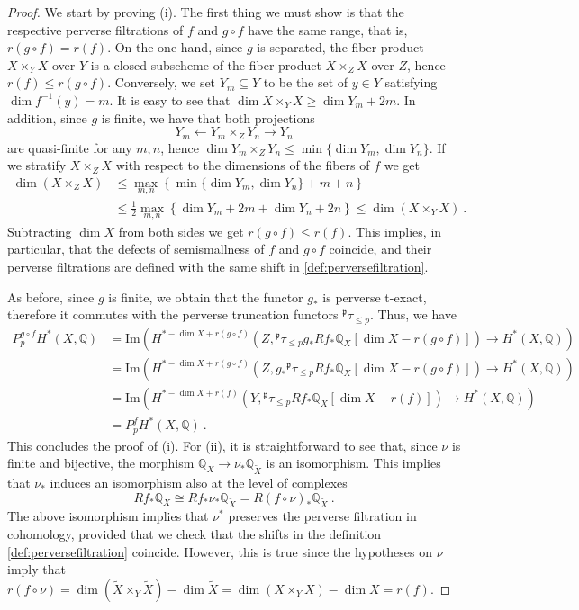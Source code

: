 \documentclass[11pt, a4paper]{amsart}
\theoremstyle{definition}
\theoremstyle{myitemstyle}
\newcommand{\Q}{\mathbb{Q}}
\begin{document}
\begin{proof}
We start by proving (i). The first thing we must show is that the respective perverse filtrations of $f$ and $g\circ f$ have the same range, that is, $r(g\circ f)=r(f)$. On the one hand, since $g$ is separated, the fiber product $X\times_YX$ over $Y$ is a closed subscheme of the fiber product $X\times_ZX$ over $Z$, hence $r(f)\leq r(g\circ f)$. Conversely, we set $Y_m\subseteq Y$ to be the set of $y\in Y$ satisfying $\dim f^{-1}(y)=m$. It is easy to see that $\dim X\times_Y X\geq \dim Y_m+2m$.
In addition, since $g$ is finite,  we have that both projections
\[ 
    Y_m\leftarrow Y_m\times_ZY_n\rightarrow Y_n
\]
are quasi-finite for any $m,n$, hence $\dim Y_m\times_ZY_n\leq \min\{\dim Y_m, \dim Y_n\}$.
If we stratify $X\times_ZX$ with respect to the dimensions of the fibers of $f$ we get
\begin{align*}
\dim(X\times_ZX) &\leq \max_{m,n}\left\lbrace\min\{\dim Y_m, \dim Y_n\}+m+n\right\rbrace\\
 &\leq \frac{1}{2}\max_{m,n}\left\lbrace \dim Y_m +2m +\dim Y_n+2n\right\rbrace\leq \dim (X\times_YX)\ .
\end{align*}
Subtracting $\dim X$ from both sides we get  $r(g\circ f)\leq r(f)$.
This implies, in particular, that the defects of semismallness of $f$ and $g\circ f$ coincide, and their perverse filtrations are defined with the same shift in \eqref{def:perversefiltration}.

As before, since $g$ is finite, we obtain that the functor $g_*$ is perverse t-exact, therefore it commutes with the perverse truncation functors $^{\mathfrak p}\tau_{\leq p}$. Thus, we have 
\begin{align*}
P^{g\circ f}_pH^*(X,\mathbb{Q})&=\mathrm{Im}\left( H^{*-\dim X+r(g\circ f)}\left( Z, {}^{\mathfrak{p}}\tau_{\leq p} g_*R f_* \mathbb{Q}_X[\dim X-r(g\circ f)] \right) \longrightarrow H^*(X, \mathbb{Q}) \right)\\
&=\mathrm{Im}\left( H^{*-\dim X+r(g\circ f)}\left( Z, g_* {}^{\mathfrak{p}}\tau_{\le p} R f_* \mathbb{Q}_X [\dim X-r(g\circ f)]\right) \longrightarrow H^*(X, \mathbb{Q}) \right)\\
&=\mathrm{Im}\left( H^{*-\dim X+r(f)}\left(Y, {}^{\mathfrak{p}}\tau_{\le p} R f_* \mathbb{Q}_X [\dim X-r(f)]\right) \longrightarrow H^*(X, \mathbb{Q}) \right)\\
&=P_p^fH^*(X,\mathbb{Q})\ .
\end{align*}
This concludes the proof of (i). 
For (ii), it is straightforward to see that, since $\nu$ is finite and bijective, the morphism $\mathbb{Q}_X\rightarrow \nu_*\Q_{\widetilde{X}}$ is an isomorphism. This implies that $\nu_*$ induces an isomorphism also at the level of complexes
\[
    Rf_*\mathbb{Q}_X\cong Rf_*\nu_*\mathbb{Q}_{\widetilde{X}}=R(f\circ \nu)_*\mathbb{Q}_{\widetilde{X}}\ .
\]
The above isomorphism implies that $\nu^*$ preserves the perverse filtration in cohomology, provided that we check that the shifts in the definition \eqref{def:perversefiltration} coincide. However, this is true since the hypotheses on $\nu$ imply that $r(f\circ\nu)= \dim (\widetilde X\times_Y\widetilde X)-\dim \widetilde X=\dim (X\times_YX)-\dim X=r(f)$.
\end{proof}
\end{document}
